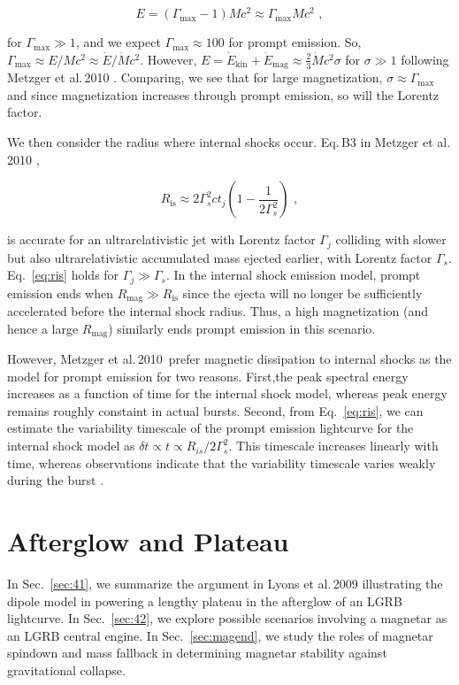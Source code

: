 \documentclass{article}
\begin{document}
\begin{equation} E = (\Gamma_{\mathrm{max}}-1) M c^2 \approx \Gamma_{\mathrm{max}} M c^2 \,\,,
\end{equation}

for $\Gamma_{\mathrm{max}} \gg 1$, and we expect $\Gamma_{\mathrm{max}}\approx 100$ for prompt emission. So, $\Gamma_{\mathrm{max}} \approx E/{M c^2} \approx \dot{E}/\dot{M} c^2$. However, $E=\dot{E}_{\mathrm{kin}}+\dot{E}_{\mathrm{mag}} \approx \frac{2}{3} \dot{M} c^2 \sigma$ for $\sigma \gg 1$ following Metzger et al.\,2010 \cite{Metzger:2010pp}. Comparing, we see that for large magnetization, $\sigma \approx \Gamma_{\mathrm{max}}$ and since magnetization increases through prompt emission, so will the Lorentz factor.

We then consider the radius where internal shocks occur. Eq.\,B3 in Metzger et al.\,2010 \cite{Metzger:2010pp},

\begin{equation}\label{eq:ris}
R_{\mathrm{is}} \approx 2\Gamma_s^2 c t_j\left(1-\frac{1}{2\Gamma_s^2}\right)\,\,,
\end{equation}

is accurate for an ultrarelativistic jet with Lorentz factor $\Gamma_j$ colliding with slower but also ultrarelativistic accumulated mass ejected earlier, with Lorentz factor $\Gamma_s$. Eq.~\ref{eq:ris} holds for $\Gamma_{j}\gg \Gamma_{s}$. In the internal shock emission model, prompt emission ends when $R_{\mathrm{mag}} \gg R_{\mathrm{is}}$ since the ejecta will no longer be sufficiently accelerated before the internal shock radius. Thus, a high magnetization (and hence a large $R_{\mathrm{mag}}$) similarly ends prompt emission in this scenario.

However, Metzger et al.\,2010\,\cite{Metzger:2010pp} prefer magnetic dissipation to internal shocks as the model for prompt emission for two reasons. First,the peak spectral energy increases as a function of time for the internal shock model, whereas peak energy remains roughly constaint in actual bursts. Second, from Eq.~\ref{eq:ris}, we can estimate the variability timescale of the prompt emission lightcurve for the internal shock model as $\delta t \propto t \propto R_{is}/2 \Gamma_s^2$. This timescale increases linearly with time, whereas observations indicate that the variability timescale varies weakly during the burst \cite{Fenimore:1999su}.

\section{Afterglow and Plateau} \label{sec:ag}
In Sec.~\ref{sec:41}, we summarize the argument in Lyons et al.\,2009 illustrating the dipole model in powering a lengthy plateau in the afterglow of an LGRB lightcurve. In Sec.~\ref{sec:42}, we explore possible scenarios involving a magnetar as an LGRB central engine. In Sec.~\ref{sec:magend}, we study the roles of magnetar spindown and mass fallback in determining magnetar stability against gravitational collapse.
\end{document}

